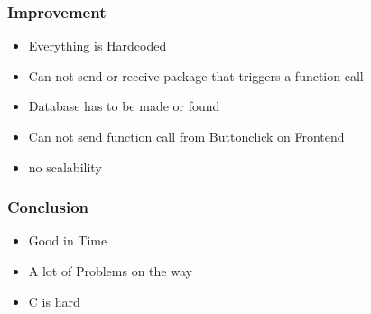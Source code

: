 \documentclass[10pt, xcolor=svgnames]{beamer}
\begin{document}
\begin{frame}
    \frametitle{Improvement}
    \begin{itemize}
        \item Everything is Hardcoded
        \item Can not send or receive package that triggers a function call
        \item Database has to be made or found
        \item Can not send function call from Buttonclick on Frontend
        \item no scalability
    \end{itemize}
\end{frame}

\begin{frame}
    \frametitle{Conclusion}

    \begin{itemize}
        \item Good in Time
        \item A lot of Problems on the way
        \item C is hard
    \end{itemize}
\end{frame}
\end{document}
